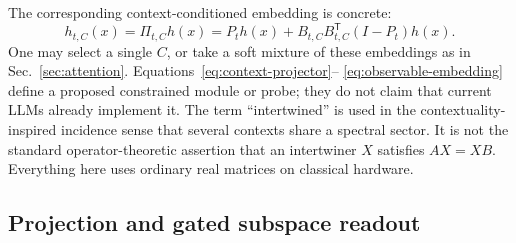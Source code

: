 \documentclass[
  aps,
  reprint,
  superscriptaddress,
  floatfix,
  nofootinbib,
  longbibliography
]{revtex4-2}
\newcommand{\T}{^{\mathsf{T}}}
\begin{document}
The corresponding context-conditioned embedding is concrete:
%
\begin{equation}
\label{eq:observable-embedding}
h_{t,C}(x)
=\Pi_{t,C}h(x)
=P_t h(x)+B_{t,C}B_{t,C}\T(I-P_t)h(x).
\end{equation}
%
One may select a single $C$, or take a soft mixture of these embeddings as in
Sec.~\ref{sec:attention}.  Equations~\eqref{eq:context-projector}--
\eqref{eq:observable-embedding} define a proposed constrained module or probe;
they do not claim that current LLMs already implement it.  The term
``intertwined'' is used in the contextuality-inspired incidence sense that
several contexts share a spectral sector.  It is not the standard
operator-theoretic assertion that an intertwiner $X$ satisfies $AX=XB$.
Everything here uses ordinary real matrices on classical hardware.

\subsection{Projection and gated subspace readout}
\label{sec:gated}
\end{document}

